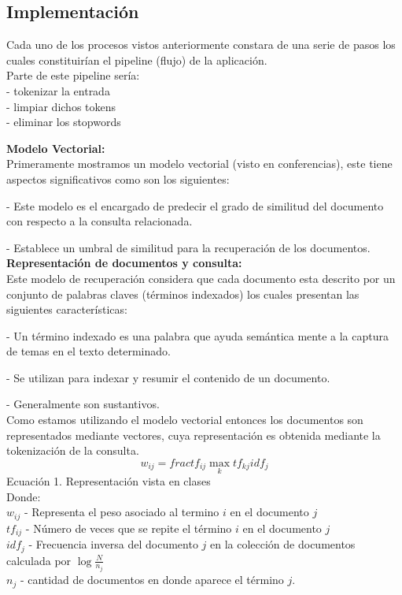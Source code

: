 \documentclass[runningheads]{llncs}
\begin{document}
\subsection*{Implementación}
Cada uno de los procesos vistos anteriormente constara de una serie de pasos los cuales constituirían el pipeline (flujo) de la aplicación.\\

Parte de este pipeline sería: \\
- tokenizar la entrada \\
- limpiar dichos tokens \\
- eliminar los stopwords

\textbf{Modelo Vectorial:}\\
Primeramente mostramos un modelo vectorial (visto en conferencias), este tiene aspectos significativos como son los siguientes:

-	Este modelo es el encargado de predecir el grado de similitud del documento con respecto a la consulta relacionada.

-	Establece un umbral de similitud para la recuperación de los documentos.\\

\textbf{Representación de documentos y consulta:}\\
Este modelo de recuperación considera que cada documento esta descrito por un conjunto de palabras claves (términos indexados) los cuales presentan las siguientes características:

-	Un término indexado es una palabra que ayuda semántica mente a la captura de temas en el texto determinado.

-	Se utilizan para indexar y resumir el contenido de un documento.

-	Generalmente son sustantivos.\\


Como estamos utilizando el modelo vectorial entonces los documentos son representados mediante vectores, cuya representación es obtenida mediante la tokenización de la consulta.
\begin{equation}
	w_{ij} = frac{tf_{ij}}{\max_{k} tf_{kj}}idf_{j}
\end{equation}
Ecuación 1. Representación vista en clases\\

Donde:\\
$ w_{ij} $ - Representa el peso asociado al termino $ i $ en el documento $ j $\\
$tf_{ij}$ - Número de veces que se repite el término $i$ en el documento $j$\\
$idf_{j}$ - Frecuencia inversa del documento $j$ en la colección de documentos calculada por $\log{\frac{N}{n_j}}$\\
$n_j$ - cantidad de documentos en donde aparece el término $j$.\\
\end{document}
